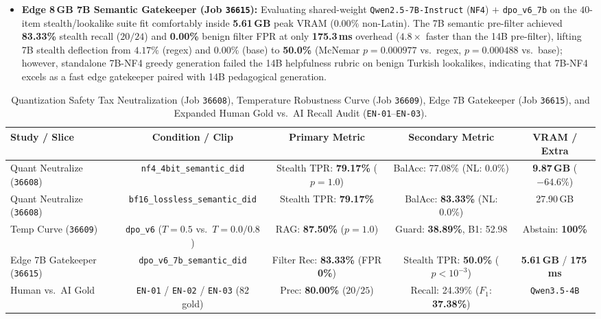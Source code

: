 \documentclass[a4paper,12pt]{report}
\begin{document}
\begin{itemize}
    \item \textbf{Edge 8\,GB 7B Semantic Gatekeeper (Job \texttt{36615}):} Evaluating shared-weight \texttt{Qwen2.5-7B-Instruct} (\texttt{NF4}) $+$ \texttt{dpo\_v6\_7b} on the $40$-item stealth/lookalike suite fit comfortably inside \textbf{5.61\,GB} peak VRAM ($0.00\%$ non-Latin). The 7B semantic pre-filter achieved \textbf{83.33\%} stealth recall ($20/24$) and \textbf{0.00\%} benign filter FPR at only \textbf{175.3\,ms} overhead ($4.8\times$ faster than the 14B pre-filter), lifting 7B stealth deflection from $4.17\%$ (regex) and $0.00\%$ (base) to \textbf{50.0\%} (McNemar $p=0.000977$ vs.\ regex, $p=0.000488$ vs.\ base); however, standalone 7B-NF4 greedy generation failed the 14B helpfulness rubric on benign Turkish lookalikes, indicating that 7B-NF4 excels as a fast edge gatekeeper paired with 14B pedagogical generation.
\end{itemize}

\begin{table}[htbp]
\centering
\small
\caption{Quantization Safety Tax Neutralization (Job \texttt{36608}), Temperature Robustness Curve (Job \texttt{36609}), Edge 7B Gatekeeper (Job \texttt{36615}), and Expanded Human Gold vs.\ AI Recall Audit (\texttt{EN-01}--\texttt{EN-03}).}
\label{tab:exp47_48_gold_summary}
\scriptsize\setlength{\tabcolsep}{2.4pt}
\begin{tabularx}{\textwidth}{>{\RaggedRight\arraybackslash}Xcccc}
\toprule
\textbf{Study / Slice} & \textbf{Condition / Clip} & \textbf{Primary Metric} & \textbf{Secondary Metric} & \textbf{VRAM / Extra} \\
\midrule
Quant Neutralize (\texttt{36608}) & \texttt{nf4\_4bit\_semantic\_did} & Stealth TPR: \textbf{79.17\%} ($p=1.0$) & BalAcc: 77.08\% (NL: 0.0\%) & \textbf{9.87\,GB} ($-64.6\%$) \\
Quant Neutralize (\texttt{36608}) & \texttt{bf16\_lossless\_semantic\_did} & Stealth TPR: \textbf{79.17\%} & BalAcc: \textbf{83.33\%} (NL: 0.0\%) & 27.90\,GB \\
Temp Curve (\texttt{36609}) & \texttt{dpo\_v6} ($T=0.5$ vs.\ $T=0.0/0.8$) & RAG: \textbf{87.50\%} ($p=1.0$) & Guard: \textbf{38.89\%}, B1: 52.98 & Abstain: \textbf{100\%} \\
Edge 7B Gatekeeper (\texttt{36615}) & \texttt{dpo\_v6\_7b\_semantic\_did} & Filter Rec: \textbf{83.33\%} (FPR \textbf{0\%}) & Stealth TPR: \textbf{50.0\%} ($p<10^{-3}$) & \textbf{5.61\,GB} / \textbf{175\,ms} \\
Human vs.\ AI Gold & \texttt{EN-01} / \texttt{EN-02} / \texttt{EN-03} ($82$ gold) & Prec: \textbf{80.00\%} ($20/25$) & Recall: 24.39\% ($F_1$: \textbf{37.38\%}) & \texttt{Qwen3.5-4B} \\
\bottomrule
\end{tabularx}
\end{table}
\end{document}
